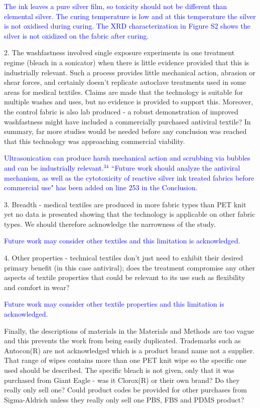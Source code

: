 \documentclass[12pt]{letter}
\newcommand{\blue}[1]{\textcolor{blue}{#1}} %
\begin{document}
\blue{The ink leaves a pure silver film, so toxicity should not be different than elemental silver. The curing temperature is low and at this temperature the silver is not oxidised during curing. The XRD characterization in Figure S2 shows the silver is not oxidized on the fabric after curing. }

2. The washfastness involved single exposure experiments in one treatment regime (bleach in a sonicator) when there is little evidence provided that this is industrially relevant. Such a process provides little mechanical action, abrasion or shear forces, and certainly doesn't replicate autoclave treatments used in some areas for medical textiles. Claims are made that the technology is suitable for multiple washes and uses, but no evidence is provided to support this. Moreover, the control fabric is also lab produced - a robust demonstration of improved washfastness might have included a commercially purchased antiviral textile? In summary, far more studies would be needed before any conclusion was reached that this technology was approaching commercial viability.

\blue{Ultrasonication can produce harsh mechanical action and scrubbing via bubbles and can be industrially relevant.$^34$ ``Future work should analyze the antiviral mechanism, as well as the cytotoxicity of reactive silver ink treated fabrics before
commercial use" has been added on line 253 in the Conclusion.  }

3. Breadth - medical textiles are produced in more fabric types than PET knit yet no data is presented showing that the technology is applicable on other fabric types. We should therefore acknowledge the narrowness of the study.

\blue{Future work may consider other textiles and this limitation is acknowledged.  }

4. Other properties - technical textiles don't just need to exhibit their desired primary benefit (in this case antiviral); does the treatment compromise any other aspects of textile properties that could be relevant to its use such as flexibility and comfort in wear?

\blue{Future work may consider other textile properties and this limitation is acknowledged.  }

Finally, the descriptions of materials in the Materials and Methods are too vague and this prevents the work from being easily duplicated. Trademarks such as Antocon(R) are not acknowledged which is a product brand name not a supplier. That range of wipes contains more than one PET knit wipe so the specific one used should be described. The specific bleach is not given, only that it was purchased from Giant Eagle - was it Clorox(R) or their own brand? Do they really only sell one? Could product codes be provided for other purchases from Sigma-Aldrich unless they really only sell one PBS, FBS and PDMS product?
\end{document}
